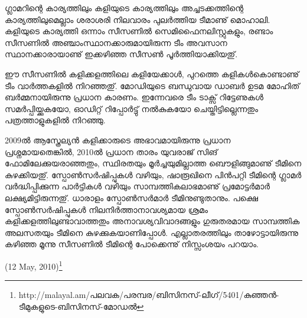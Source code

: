 ഗ്ലാമറിന്റെ കാര്യത്തിലും കളിയുടെ കാര്യത്തിലും അച്ചടക്കത്തിന്റെ കാര്യത്തിലുമെല്ലാം ശരാശരി നിലവാരം പുലര്‍ത്തിയ 
ടീമാണു് മൊഹാലി. കളിയുടെ കാര്യത്തി ഒന്നാം സീസണില്‍ സെമിഫൈനലിസ്റ്റുകളും, രണ്ടാം സീസണില്‍ 
അഞ്ചാംസ്ഥാനക്കാരുമായിരുന്ന ടീം അവസാന സ്ഥാനക്കാരായാണു് ഇക്കഴിഞ്ഞ സീസണ്‍ പൂര്‍ത്തിയാക്കിയതു്.

ഈ സീസണില്‍ കളിക്കളത്തിലെ കളിയേക്കാള്‍, പുറത്തെ കളികള്‍കൊണ്ടാണു് ടീം വാര്‍ത്തകളില്‍ നിറഞ്ഞതു്. 
മോഡിയുടെ ബന്ധുവായ ഡാബര്‍ ഉടമ മോഹിത് ബര്‍മ്മനായിരുന്നു പ്രധാന കാരണം. ഇന്നേവരെ ടീം ടാക്സ് റിട്ടേണുകള്‍ 
സമര്‍പ്പിയ്ക്കുകയോ, ഓഡിറ്റ് റിപ്പോര്‍ട്ടു് നല്‍കുകയോ ചെയ്തിട്ടില്ലെന്നതും പത്രത്താളുകളില്‍ നിറഞ്ഞു.

2009ല്‍ ആസ്ത്രേല്യന്‍ കളിക്കാരുടെ അഭാവമായിരുന്നു പ്രധാന പ്രശ്നമായതെങ്കില്‍, 2010ല്‍ പ്രധാന താരം യുവരാജ് സിങ് 
ഫോമിലേക്കുയരാഞ്ഞതും, സ്ഥിരതയും മൂര്‍ച്ചയുമില്ലാത്ത ബൌളിങ്ങുമാണു് ടീമിനെ കുഴക്കിയതു്. സ്പോണ്‍സര്‍ഷിപ്പുകള്‍ വഴിയും, 
ഷാരൂഖിനെ പിന്‍പറ്റി ടീമിന്റെ ഗ്ലാമര്‍ വര്‍ദ്ധിപ്പിക്കുന്ന പാര്‍ട്ടികള്‍ വഴിയും സാമ്പത്തികലാഭമാണു് പ്രമോട്ടര്‍മാര്‍ ലക്ഷ്യമിട്ടിരുന്നതു്. 
ധാരാളം സ്പോണ്‍സര്‍മാര്‍ ടീമിനുണ്ടുതാനും. പക്ഷെ സ്പോണ്‍സര്‍ഷിപ്പുകള്‍ നിലനിര്‍ത്താനാവശ്യമായ ശ്രമം 
കളിക്കളത്തിലുണ്ടാവാത്തതും അനാവശ്യവിവാദങ്ങളും ഗുരുതരമായ സാമ്പത്തിക അലസതയും ടീമിനെ കുഴക്കുകയാണിപ്പോള്‍. 
എല്ലാതരത്തിലും താഴോട്ടായിരുന്നു കഴിഞ്ഞ മൂന്നു സീസണില്‍ ടീമിന്റെ പോക്കെന്നു് നിസ്സംശയം പറയാം.

\begin{flushright}(12 May, 2010)\footnote{http://malayal.am/പലവക/പരമ്പര/ബിസിനസ്-ലീഗ്/5401/കുഞ്ഞന്‍-ടീമുകളുടെ-ബിസിനസ്-മോഡല്‍}\end{flushright}

\newpage
